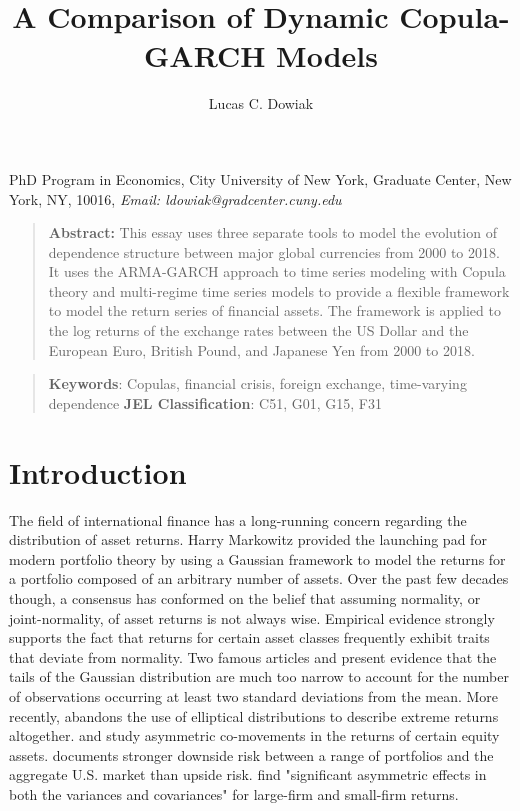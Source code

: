 \documentclass[12pt]{article}
\title{A Comparison of Dynamic Copula-GARCH Models}
\author{Lucas C. Dowiak}
\begin{document}
 
\maketitle{}
 
PhD Program in Economics, City University of New York\smallskip, Graduate Center,
New York, NY, 10016, \textit{Email: ldowiak@gradcenter.cuny.edu}

\qquad

\begin{quotation}
\textbf{Abstract:} This essay uses three separate tools to model the evolution of dependence structure between major global currencies from 2000 to 2018. It uses the ARMA-GARCH approach to time series modeling with Copula theory and multi-regime time series models to provide a flexible framework to model the return series of financial assets. The framework is applied to the log returns of the exchange rates between the US Dollar and the European Euro, British Pound, and Japanese Yen from 2000 to 2018.
\end{quotation}

\vspace{1pt}

\begin{quotation}
\textbf{Keywords}: Copulas, financial crisis, foreign exchange, time-varying dependence
\textbf{JEL Classification}: C51, G01, G15, F31
\end{quotation}

\vspace{1pt}

\section{Introduction}

The field of international finance has a long-running concern regarding the distribution of asset returns. Harry Markowitz \cite{Markowitz_1952, Markowitz_1959} provided the launching pad for modern portfolio theory by using a Gaussian framework to model the returns for a portfolio composed of an arbitrary number of assets. Over the past few decades though, a consensus has conformed on the belief that assuming normality, or joint-normality, of asset returns is not always wise. Empirical evidence strongly supports the fact that returns for certain asset classes frequently exhibit traits that deviate from normality. Two famous articles \cite{Mandelbrot_1963} and \cite{Fama_1965} present evidence that the tails of the Gaussian distribution are much too narrow to account for the number of observations occurring at least two standard deviations from the mean. More recently, \cite{Longin_1996} abandons the use of elliptical distributions to describe extreme returns altogether. \cite{Ang_and_Chen_2002} and \cite{Kroner_and_Ng_1998} study asymmetric co-movements in the returns of certain equity assets. \cite{Ang_and_Chen_2002} documents stronger downside risk between a range of portfolios and the aggregate U.S. market than upside risk. \cite{Kroner_and_Ng_1998} find "significant asymmetric effects in both the variances and covariances" for large-firm and small-firm returns.
\end{document}
